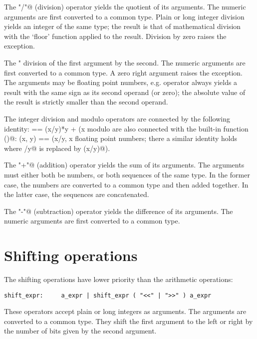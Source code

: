 The \verb@"/"@ (division) operator yields the quotient of its
arguments.  The numeric arguments are first converted to a common
type.  Plain or long integer division yields an integer of the same
type; the result is that of mathematical division with the `floor'
function applied to the result.  Division by zero raises the
\verb@ZeroDivisionError@ exception.

The \verb@"%"@ (modulo) operator yields the remainder from the
division of the first argument by the second.  The numeric arguments
are first converted to a common type.  A zero right argument raises
the \verb@ZeroDivisionError@ exception.  The arguments may be floating
point numbers, e.g.  %
operator always yields a result with the same sign as its second
operand (or zero); the absolute value of the result is strictly
smaller than the second operand.

The integer division and modulo operators are connected by the
following identity: \verb@x == (x/y)*y + (x%y)@.  Integer division and
modulo are also connected with the built-in function \verb@divmod()@:
\verb@divmod(x, y) == (x/y, x%y)@.  These identities don't hold for
floating point numbers; there a similar identity holds where
\verb@x/y@ is replaced by \verb@floor(x/y)@).

The \verb@"+"@ (addition) operator yields the sum of its arguments.
The arguments must either both be numbers, or both sequences of the
same type.  In the former case, the numbers are converted to a common
type and then added together.  In the latter case, the sequences are
concatenated.

The \verb@"-"@ (subtraction) operator yields the difference of its
arguments.  The numeric arguments are first converted to a common
type.

\section{Shifting operations}

The shifting operations have lower priority than the arithmetic
operations:

\begin{verbatim}
shift_expr:     a_expr | shift_expr ( "<<" | ">>" ) a_expr
\end{verbatim}

These operators accept plain or long integers as arguments.  The
arguments are converted to a common type.  They shift the first
argument to the left or right by the number of bits given by the
second argument.

